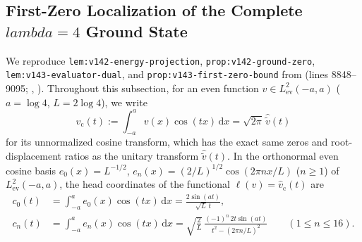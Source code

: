 \documentclass[11pt]{article}
\def\lambda{lambda}%
\theoremstyle{remark}
\newcommand{\dd}{\mathrm d}
\begin{document}
\subsection{First-Zero Localization of the Complete \texorpdfstring{$\lambda = 4$}{lambda = 4} Ground State}
We reproduce \texttt{lem:v142-\allowbreak energy-\allowbreak projection}, \texttt{prop:v142-\allowbreak ground-\allowbreak zero}, \texttt{lem:v143-\allowbreak evaluator-\allowbreak dual}, and \texttt{prop:v143-\allowbreak first-\allowbreak zero-\allowbreak bound} from  (lines 8848--9095; , ). Throughout this subsection, for an even function $v \in L^2_{\mathrm{ev}}(-a,a)$ ($a = \log 4$, $L = 2\log 4$), we write
\begin{equation}\label{eq:unnormalized-cosine-transform}
  \widehat{v}_{\mathrm{c}}(t) := \int_{-a}^a v(x)\cos(tx)\,\dd x = \sqrt{2\pi}\,\widehat{\widetilde{v}}(t)
\end{equation}
for its unnormalized cosine transform, which has the exact same zeros and root-displacement ratios as the unitary transform $\widehat{\widetilde{v}}(t)$. In the orthonormal even cosine basis $e_0(x) = L^{-1/2}$, $e_n(x) = (2/L)^{1/2}\cos(2\pi n x/L)$ ($n \ge 1$) of $L^2_{\mathrm{ev}}(-a,a)$, the head coordinates of the functional $\ell(v) = \widehat{v}_{\mathrm{c}}(t)$ are
\begin{equation}\label{eq:cosine-head-coords}
\begin{aligned}
  c_0(t) &= \int_{-a}^a e_0(x)\cos(tx)\,\dd x = \frac{2\sin(at)}{\sqrt{L}\,t}, \\
  c_n(t) &= \int_{-a}^a e_n(x)\cos(tx)\,\dd x = \sqrt{\frac{2}{L}}\,\frac{(-1)^n\,2t\sin(at)}{t^2 - (2\pi n/L)^2} \qquad (1 \le n \le 16).
\end{aligned}
\end{equation}
\end{document}
